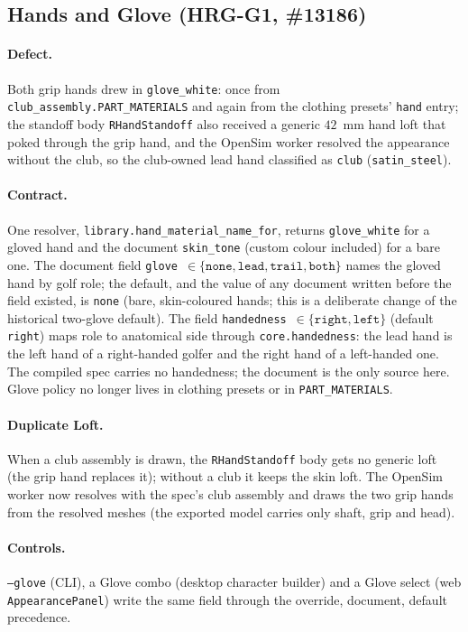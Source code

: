 \subsection{Hands and Glove (HRG-G1, \#13186)}
\paragraph{Defect.} Both grip hands drew in \texttt{glove\_white}: once from
\texttt{club\_assembly.PART\_MATERIALS} and again from the clothing presets'
\texttt{hand} entry; the standoff body \texttt{RHandStandoff} also received a
generic $42$~mm hand loft that poked through the grip hand, and the OpenSim
worker resolved the appearance without the club, so the club-owned lead hand
classified as \texttt{club} (\texttt{satin\_steel}).
\paragraph{Contract.} One resolver, \texttt{library.hand\_material\_name\_for},
returns \texttt{glove\_white} for a gloved hand and the document \texttt{skin\_tone}
(custom colour included) for a bare one. The document field
\texttt{glove}~$\in\{\texttt{none},\texttt{lead},\texttt{trail},\texttt{both}\}$
names the gloved hand by golf role; the default, and the value of any document
written before the field existed, is \texttt{none} (bare, skin-coloured hands;
this is a deliberate change of the historical two-glove default). The field
\texttt{handedness}~$\in\{\texttt{right},\texttt{left}\}$ (default
\texttt{right}) maps role to anatomical side through
\texttt{core.handedness}: the lead hand is the left hand of a right-handed
golfer and the right hand of a left-handed one. The compiled spec carries no
handedness; the document is the only source here. Glove policy no longer lives in
clothing presets or in \texttt{PART\_MATERIALS}.
\paragraph{Duplicate Loft.} When a club assembly is drawn, the
\texttt{RHandStandoff} body gets no generic loft (the grip hand replaces it);
without a club it keeps the skin loft. The OpenSim worker now resolves with the
spec's club assembly and draws the two grip hands from the resolved meshes (the
exported model carries only shaft, grip and head).
\paragraph{Controls.} \texttt{--glove} (CLI), a Glove combo (desktop character
builder) and a Glove select (web \texttt{AppearancePanel}) write the same field
through the override, document, default precedence.
